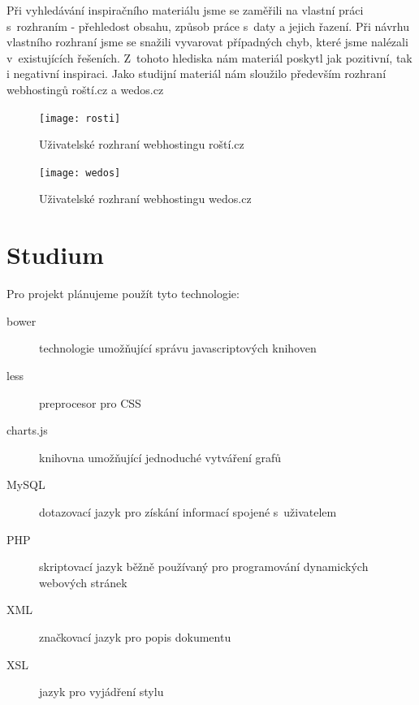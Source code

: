 \documentclass[11pt,a4paper]{article}
\begin{document}
    Při vyhledávání inspiračního materiálu jsme se zaměřili na vlastní práci
    s~rozhraním - přehledost obsahu, způsob práce s~daty a jejich řazení.
    Při návrhu vlastního rozhraní jsme se snažili vyvarovat případných chyb,
    které jsme nalézali v~existujících řešeních. Z~tohoto hlediska nám
    materiál poskytl jak pozitivní, tak i negativní inspiraci.  Jako studijní
    materiál nám sloužilo především rozhraní webhostingů roští.cz a wedos.cz \\
    \begin{figure}[ht]
      \begin{center}
        \texttt{[image: rosti]}
        \caption{Uživatelské rozhraní webhostingu roští.cz}
      \end{center}
    \end{figure}
    \begin{figure}[ht]
      \begin{center}
        \texttt{[image: wedos]}
        \caption{Uživatelské rozhraní webhostingu wedos.cz}
      \end{center}
    \end{figure}

  \section{Studium}

    Pro projekt plánujeme použít tyto technologie:
    \begin{description}
      \item[bower] technologie umožňující správu javascriptových knihoven
      \item[less] preprocesor pro CSS
      \item[charts.js] knihovna umožňující jednoduché vytváření grafů
      \item[MySQL] dotazovací jazyk pro získání informací spojené s~uživatelem
      \item[PHP] skriptovací jazyk běžně používaný pro programování
                   dynamických webových stránek
      \item[XML] značkovací jazyk pro popis dokumentu
      \item[XSL] jazyk pro vyjádření stylu
    \end{description}

\end{document}
